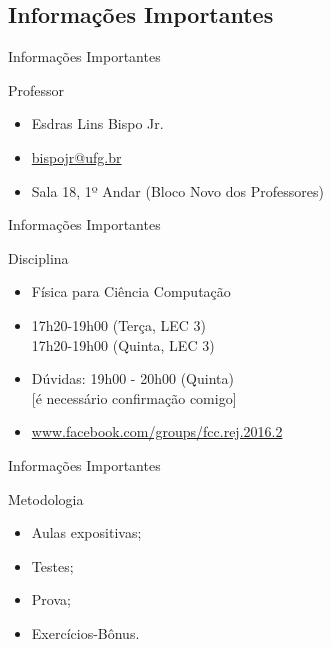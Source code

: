 \documentclass[xcolor=dvipsnames,table]{beamer}
\begin{document}
	\subsection{Informações Importantes}
	\begin{frame}{Informações Importantes}
		\begin{block}{Professor}
			\begin{itemize}
				\item Esdras Lins Bispo Jr.
				\item \url{bispojr@ufg.br}
				\item Sala 18, 1º Andar (Bloco Novo dos Professores)
			\end{itemize}
		\end{block}
	\end{frame}	
	
	\begin{frame}{Informações Importantes}
		\begin{block}{Disciplina}
			\begin{itemize}
				\item Física para Ciência Computação
				\item 17h20-19h00 (Terça, LEC 3)\\
					  17h20-19h00 (Quinta, LEC 3)
				\item Dúvidas: 19h00 - 20h00 (Quinta)\\
					  {\color{red}[é necessário confirmação comigo]}
				\item \url{www.facebook.com/groups/fcc.rej.2016.2}
			\end{itemize}
		\end{block}
	\end{frame}
	
	\begin{frame}{Informações Importantes}
		\begin{block}{Metodologia}
			\begin{itemize}
				\item Aulas expositivas;
				\item Testes;
				\item Prova;
				\item Exercícios-Bônus.
			\end{itemize}
		\end{block}
	\end{frame}
	
\end{document}
